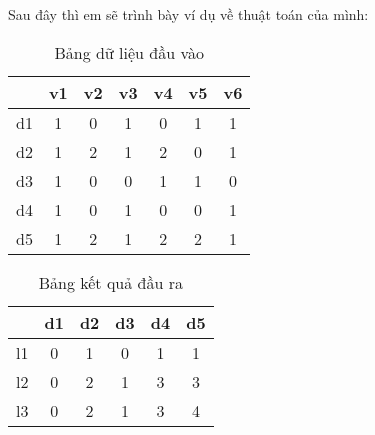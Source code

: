 \hspace*{10mm}Sau đây thì em sẽ trình bày ví dụ về thuật toán của mình:\\
\begin{table}[ht]
\caption{Bảng dữ liệu đầu vào}
\label{tab::bdldv1}
\begin{center}
\begin{tabular}{|c |c |c |c |c |c |c |}
\cline{2-7}
\multicolumn{1}{c|}{} & v1 & v2 & v3 & v4 & v5 & v6\\ \hline
d1 & 1 & 0 & 1 & 0 & 1 & 1\\ \hline
d2 & 1 & 2 & 1 & 2 & 0 & 1\\ \hline
d3 & 1 & 0 & 0 & 1 & 1 & 0\\ \hline
d4 & 1 & 0 & 1 & 0 & 0 & 1\\ \hline
d5 & 1 & 2 & 1 & 2 & 2 & 1\\ \hline
\end{tabular}
\end{center}
\end{table}
\clearpage
\begin{table}[ht]
\caption{Bảng kết quả đầu ra}
\label{tab::bkqdr1}
\begin{center}
\begin{tabular}{|c|c|c|c|c|c|}
\cline{2-6}
\multicolumn{1}{c|}{}& d1 & d2 & d3 & d4 & d5\\ \hline
l1 & 0 & 1 & 0 & 1 & 1\\ \hline
l2 & 0 & 2 & 1 & 3 & 3\\ \hline
l3 & 0 & 2 & 1 & 3 & 4\\ \hline
\end{tabular}
\end{center}
\end{table}
%

